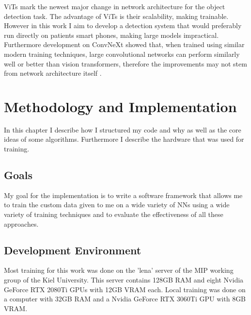 \documentclass[10pt]{book}
\begin{document}
\acp{ViT} mark the newest major change in network architecture for the object detection task. The advantage of \acp{ViT} is their scalability, making \cite[models of unprecedented size]{dosovitskiy2020image} trainable. However in this work I aim to develop a detection system that would preferably run directly on patients smart phones, making large models impractical. Furthermore development on ConvNeXt showed that, when trained using similar modern training techniques, large convolutional networks can perform similarly well or better than vision transformers, therefore the improvements may not stem from network architecture itself \cite{liu2022convnet}.


\chapter{Methodology and Implementation}
\label{chap:implement}

In this chapter I describe how I structured my code and why as well as the core ideas of some algorithms. Furthermore I describe the hardware that was used for training.

\section{Goals}


My goal for the implementation is to write a software framework that allows me to train the custom data given to me on a wide variety of \acp{NN} using a wide variety of training techniques and to evaluate the effectiveness of all these approaches.

\section{Development Environment}

Most training for this work was done on the 'lena' server of the \ac{MIP} working group of the Kiel University. This server contains 128GB RAM and eight Nvidia GeForce RTX 2080Ti \acp{GPU} with 12GB VRAM each. Local training was done on a computer with 32GB RAM and a Nvidia GeForce RTX 3060Ti \ac{GPU} with 8GB VRAM.
\end{document}
